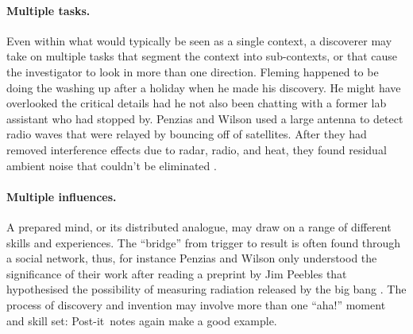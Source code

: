 \paragraph{Multiple tasks.}

Even within what would typically be seen as a single context, a
discoverer may take on multiple tasks that segment the context into
sub-contexts, or that cause the investigator to look in more than one
direction.
%
Fleming happened to be doing the washing up after a holiday when he
made his discovery.  He might have overlooked the critical details had
he not also been chatting with a former lab assistant who had stopped
by.  Penzias and Wilson used a large antenna to detect radio waves
that were relayed by bouncing off of satellites.  After they had
removed interference effects due to radar, radio, and heat, they found
residual ambient noise that couldn't be eliminated
\cite{wiki:cosmic-radiation}.

\paragraph{Multiple influences.}

A prepared mind, or its distributed analogue, may draw on a range of
different skills and experiences.  The ``bridge'' from trigger to
result is often found through a social network, thus, for instance
Penzias and Wilson only understood the significance of their work
after reading a preprint by Jim Peebles that hypothesised the
possibility of measuring radiation released by the big bang
\cite{wiki:cosmic-radiation}.
%
The process of discovery and invention may involve more than one
``aha!'' moment and skill set: Post-it\texttrademark\ notes again make
a good example.

